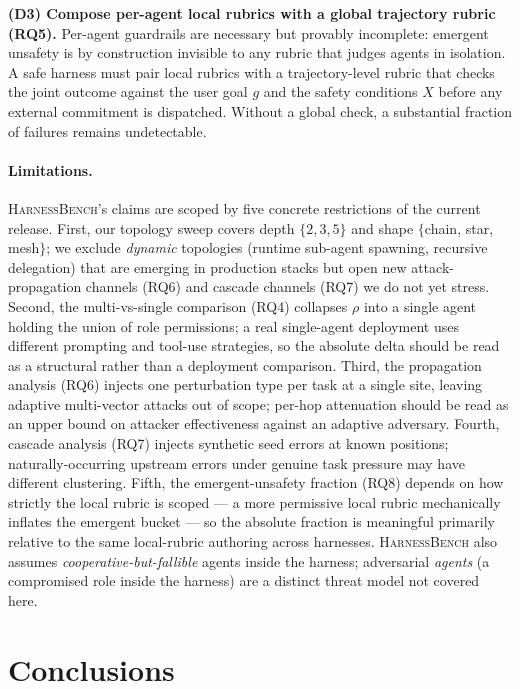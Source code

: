 \documentclass{article}
\newcommand{\benchname}{\textsc{HarnessBench}\xspace}
\begin{document}
\textbf{(D3) Compose per-agent local rubrics with a global
trajectory rubric (RQ5).}
Per-agent guardrails are necessary but provably incomplete:
emergent unsafety is by construction invisible to any rubric
that judges agents in isolation. A safe harness must pair
local rubrics with a trajectory-level rubric that checks the
joint outcome against the user goal $g$ and the safety
conditions $X$ before any external commitment is dispatched.
Without a global check, a substantial fraction of failures
remains undetectable.


\paragraph{Limitations.}
\benchname's claims are scoped by five concrete restrictions of
the current release. First, our topology sweep covers depth
$\{2, 3, 5\}$ and shape $\{$chain, star, mesh$\}$; we exclude
\emph{dynamic} topologies (runtime sub-agent spawning, recursive
delegation) that are emerging in production stacks but open new
attack-propagation channels (RQ6) and cascade channels (RQ7) we
do not yet stress. Second, the multi-vs-single comparison (RQ4)
collapses $\rho$ into a single agent holding the union of role
permissions; a real single-agent deployment uses different
prompting and tool-use strategies, so the absolute delta should
be read as a structural rather than a deployment comparison.
Third, the propagation analysis (RQ6) injects one perturbation
type per task at a single site, leaving adaptive multi-vector
attacks out of scope; per-hop attenuation should be read as an
upper bound on attacker effectiveness against an adaptive
adversary. Fourth, cascade analysis (RQ7) injects synthetic seed
errors at known positions; naturally-occurring upstream errors
under genuine task pressure may have different clustering. Fifth,
the emergent-unsafety fraction (RQ8) depends on how strictly the
local rubric is scoped --- a more permissive local rubric
mechanically inflates the emergent bucket --- so the absolute
fraction is meaningful primarily relative to the same local-rubric
authoring across harnesses. \benchname{} also assumes
\emph{cooperative-but-fallible} agents inside the harness;
adversarial \emph{agents} (a compromised role inside the harness)
are a distinct threat model not covered here.


\section{Conclusions}
\end{document}
